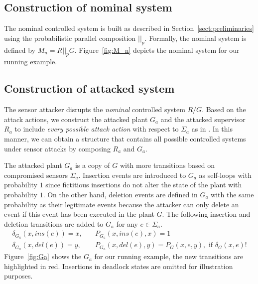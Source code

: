 
\subsection{Construction of nominal system}
The nominal controlled system is built as described in Section~\ref{sect:preliminaries} using the probabilistic parallel composition $||_p$.
Formally, the nominal system is defined by $M_n = R||_pG$.
Figure~\ref{fig:M_n} depicts the nominal system for our running example.

\subsection{Construction of attacked system}\label{sub:controlled-system}
The sensor attacker disrupts the \emph{nominal} controlled system $R/G$.
Based on the attack actions, we construct the attacked plant $G_a$ and the attacked supervisor $R_a$ to include \emph{every possible attack action} with respect to $\Sigma_a$ as in \citep{meira-goes:2021synthesis}. 
In this manner, we can obtain a structure that contains all possible controlled systems under sensor attacks by composing $R_a$ and $G_a$.

The attacked plant $G_a$ is a copy of $G$ with more transitions based on compromised sensors $\Sigma_a$.
Insertion events are introduced to $G_a$ as self-loops with probability $1$ since fictitious insertions do not alter the state of the plant with probability $1$.
On the other hand, deletion events are defined in $G_a$ with the same probability as their legitimate events because the attacker can only delete an event if this event has been executed in the plant $G$.
The following insertion and deletion transitions are added to $G_a$ for any $e\in \Sigma_a$.
\begin{align}
\delta_{G_a}(x,ins(e)) = x, \quad & P_{G_a}(x,ins(e),x) = 1\label{eq:ins_plant}\\
\delta_{G_a}(x,del(e)) = y, \quad & P_{G_a}(x,del(e),y) = P_{G}(x,e,y), \text{ if } \delta_G(x,e)!\label{eq:del_plant}
\end{align}
Figure~\ref{fig:Ga} shows the $G_a$ for our running example, the new transitions are highlighted in red.
Insertions in deadlock states are omitted for illustration purposes.

